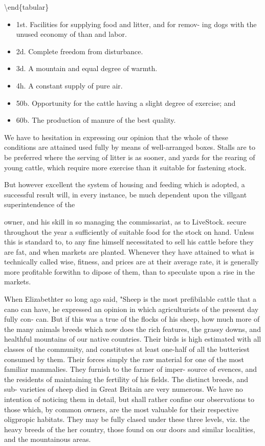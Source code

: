 \documentclass{article}
\begin{document}
\textbackslash{}end\{tabular\}

\begin{itemize}
\item 1st. Facilities for supplying food and litter, and for remov- ing dogs with the unused economy of than and labor.
\item 2d. Complete freedom from disturbance.
\item 3d. A mountain and equal degree of warmth.
\item 4h. A constant supply of pure air.
\item 50b. Opportunity for the cattle having a slight degree of exercise; and
\item 60b. The production of manure of the best quality.
\end{itemize}
We have to hesitation in expressing our opinion that the whole of these conditions are attained used fully by means of well-arranged boxes. Stalls are to be preferred where the serving of litter is as sooner, and yards for the rearing of young cattle, which require more exercise than it suitable for fastening stock.

But however excellent the system of housing and feeding which is adopted, a successful result will, in every instance, be much dependent upon the villgant superintendence of the

owner, and his skill in so managing the commissariat, as to LiveStock. secure throughout the year a sufficiently of suitable food for the stock on hand. Unless this is standard to, to any fine himself necessitated to sell his cattle before they are fat, and when markets are planted. Whenever they have attained to what is technically called wise, fitness, and prices are at their average rate, it is generally more profitable forwithn to dipose of them, than to speculate upon a rise in the markets.

When Elizabethter so long ago said, "Sheep is the most prefibilable cattle that a cano can have, he expressed an opinion in which agriculturists of the present day fully con- can. But if this was a true of the flocks of his sheep, how much more of the many animals breeds which now does the rich features, the grassy downs, and healthful mountains of our native countries. Their birds is high estimated with all classes of the community, and constitutes at least one-half of all the butteriest consumed by them. Their forces simply the raw material for one of the most familiar mammalies. They furnish to the farmer of imper- source of evences, and the residents of maintaining the fertility of his fields. The distinct breeds, and sub- varieties of sheep died in Great Britain are very numerous. We have no intention of noticing them in detail, but shall rather confine our observations to those which, by common owners, are the most valuable for their respective oligpropic habitats. They may be fully clased under these three levels, viz. the heavy breeds of the her country, those found on our doors and similar localities, and the mountainous areas.
\end{document}

